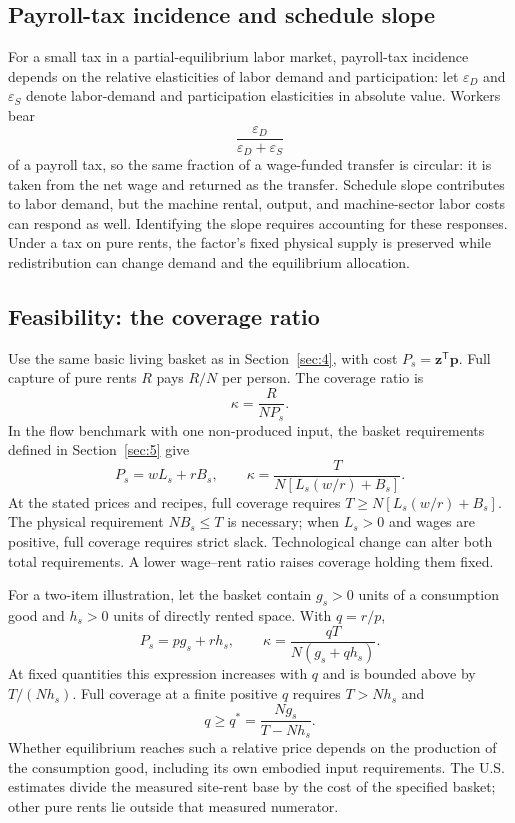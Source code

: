 \documentclass[12pt]{article}
\theoremstyle{plain}
\begin{document}
\subsection{Payroll-tax incidence and schedule slope}\label{app:D.2}

For a small tax in a partial-equilibrium labor market, payroll-tax incidence depends on the relative elasticities of labor demand and participation: let $\varepsilon_D$ and $\varepsilon_S$ denote labor-demand and participation elasticities in absolute value. Workers bear
\[
\frac{\varepsilon_D}{\varepsilon_D+\varepsilon_S}
\]
of a payroll tax, so the same fraction of a wage-funded transfer is circular: it is taken from the net wage and returned as the transfer. Schedule slope contributes to labor demand, but the machine rental, output, and machine-sector labor costs can respond as well. Identifying the slope requires accounting for these responses. Under a tax on pure rents, the factor's fixed physical supply is preserved while redistribution can change demand and the equilibrium allocation.

\subsection{Feasibility: the coverage ratio}\label{app:D.3}

Use the same basic living basket as in Section~\ref{sec:4}, with cost $P_s=\mathbf{z}^{\mathsf{T}}\mathbf{p}$. Full capture of pure rents $R$ pays $R/N$ per person. The coverage ratio is
\begin{equation}\label{eq:28}
\kappa=\frac{R}{NP_s}.
\end{equation}
In the flow benchmark with one non-produced input, the basket requirements defined in Section~\ref{sec:5} give
\[
P_s=wL_s+rB_s,\qquad
\kappa=\frac{T}{N[L_s(w/r)+B_s]}.
\]
At the stated prices and recipes, full coverage requires $T\ge N[L_s(w/r)+B_s]$. The physical requirement $NB_s\le T$ is necessary; when $L_s>0$ and wages are positive, full coverage requires strict slack. Technological change can alter both total requirements. A lower wage--rent ratio raises coverage holding them fixed.

For a two-item illustration, let the basket contain $g_s>0$ units of a consumption good and $h_s>0$ units of directly rented space. With $q=r/p$,
\[
P_s=pg_s+rh_s,\qquad
\kappa=\frac{qT}{N(g_s+qh_s)}.
\]
At fixed quantities this expression increases with $q$ and is bounded above by $T/(Nh_s)$. Full coverage at a finite positive $q$ requires $T>Nh_s$ and
\[
q\ge q^*=\frac{Ng_s}{T-Nh_s}.
\]
Whether equilibrium reaches such a relative price depends on the production of the consumption good, including its own embodied input requirements. The U.S. estimates divide the measured site-rent base by the cost of the specified basket; other pure rents lie outside that measured numerator.
\end{document}

